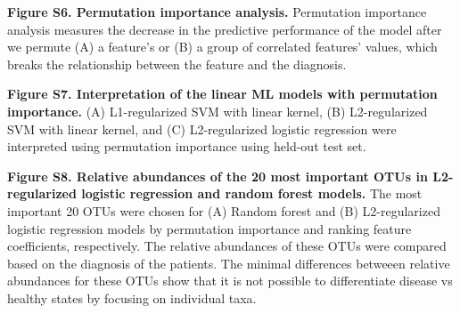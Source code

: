 \documentclass[
  11pt,
]{article}
\begin{document}
\hfill\break

\textbf{Figure S6. Permutation importance analysis.} Permutation
importance analysis measures the decrease in the predictive performance
of the model after we permute (A) a feature's or (B) a group of
correlated features' values, which breaks the relationship between the
feature and the diagnosis.

\hfill\break

\textbf{Figure S7. Interpretation of the linear ML models with
permutation importance.} (A) L1-regularized SVM with linear kernel, (B)
L2-regularized SVM with linear kernel, and (C) L2-regularized logistic
regression were interpreted using permutation importance using held-out
test set.

\hfill\break

\textbf{Figure S8. Relative abundances of the 20 most important OTUs in
L2-regularized logistic regression and random forest models.} The most
important 20 OTUs were chosen for (A) Random forest and (B)
L2-regularized logistic regression models by permutation importance and
ranking feature coefficients, respectively. The relative abundances of
these OTUs were compared based on the diagnosis of the patients. The
minimal differences betweeen relative abundances for these OTUs show
that it is not possible to differentiate disease vs healthy states by
focusing on individual taxa.
\end{document}
